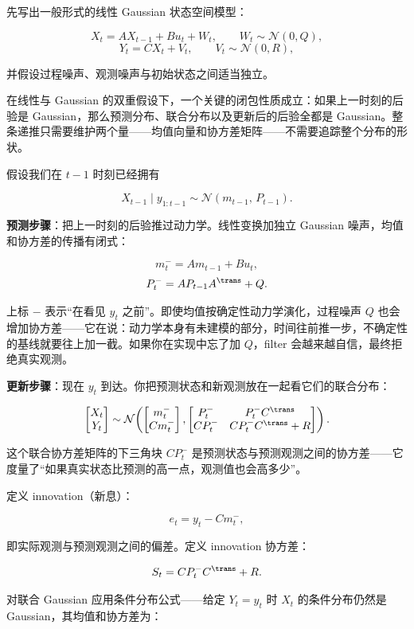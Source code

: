 先写出一般形式的线性 Gaussian 状态空间模型：

\[
X_t = A X_{t-1} + B u_t + W_t,\qquad W_t \sim \mathcal{N}(0, Q),
\]
\[
Y_t = C X_t + V_t,\qquad V_t \sim \mathcal{N}(0, R),
\]

并假设过程噪声、观测噪声与初始状态之间适当独立。

在线性与 Gaussian 的双重假设下，一个关键的闭包性质成立：如果上一时刻的后验是 Gaussian，那么预测分布、联合分布以及更新后的后验全都是 Gaussian。整条递推只需要维护两个量——均值向量和协方差矩阵——不需要追踪整个分布的形状。

假设我们在 \(t-1\) 时刻已经拥有

\[
X_{t-1} \mid y_{1:t-1} \sim \mathcal{N}(m_{t-1},\, P_{t-1}).
\]

\textbf{预测步骤}：把上一时刻的后验推过动力学。线性变换加独立 Gaussian 噪声，均值和协方差的传播有闭式：

\[
m_t^- = A m_{t-1} + B u_t,
\]
\[
P_t^- = A P_{t-1} A^{\trans} + Q.
\]

上标 \(-\) 表示``在看见 \(y_t\) 之前''。即使均值按确定性动力学演化，过程噪声 \(Q\) 也会增加协方差——它在说：动力学本身有未建模的部分，时间往前推一步，不确定性的基线就要往上加一截。如果你在实现中忘了加 \(Q\)，filter 会越来越自信，最终拒绝真实观测。

\textbf{更新步骤}：现在 \(y_t\) 到达。你把预测状态和新观测放在一起看它们的联合分布：

\[
\begin{bmatrix}
X_t \\ Y_t
\end{bmatrix}
\sim
\mathcal{N}\!\left(
\begin{bmatrix}
m_t^- \\ C m_t^-
\end{bmatrix},
\begin{bmatrix}
P_t^- & P_t^- C^{\trans} \\
C P_t^- & C P_t^- C^{\trans} + R
\end{bmatrix}
\right).
\]

这个联合协方差矩阵的下三角块 \(C P_t^-\) 是预测状态与预测观测之间的协方差——它度量了``如果真实状态比预测的高一点，观测值也会高多少''。

定义 innovation（新息）：

\[
e_t = y_t - C m_t^-,
\]

即实际观测与预测观测之间的偏差。定义 innovation 协方差：

\[
S_t = C P_t^- C^{\trans} + R.
\]

对联合 Gaussian 应用条件分布公式——给定 \(Y_t = y_t\) 时 \(X_t\) 的条件分布仍然是 Gaussian，其均值和协方差为：


